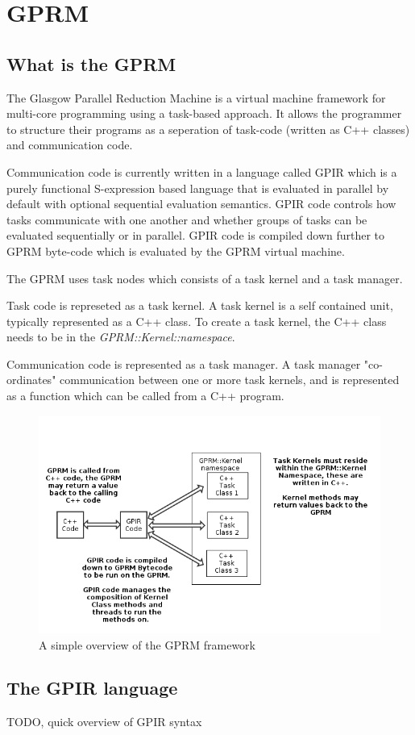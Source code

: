 \section{GPRM}

\subsection{What is the GPRM}

The Glasgow Parallel Reduction Machine is a virtual machine framework for multi-core programming using a task-based approach. It allows the programmer to structure their programs as a seperation of task-code (written as C++ classes) and communication code. 

Communication code is currently written in a language called GPIR which is a purely functional S-expression based language that is evaluated in parallel by default with optional sequential evaluation semantics. GPIR code controls how tasks communicate with one another and whether groups
of tasks can be evaluated sequentially or in parallel.  GPIR code is compiled down further to GPRM byte-code which is evaluated by the GPRM virtual machine.

The GPRM uses task nodes which consists of a task kernel and a task manager.

Task code is represeted as a task kernel. A task kernel is a self contained unit, typically represented as a C++ class.
To create a task kernel, the C++ class needs to be in the \textit{GPRM::Kernel::namespace}.

Communication code is represented as a task manager. A task manager "co-ordinates" communication between one or more task kernels, and
is represented as a function which can be called from a C++ program.\cite{GPRM}

\newpage

\begin{figure}[ht]
\begin{center}
\includegraphics{graphs/gprm.png}
\caption{A simple overview of the GPRM framework}
\end{center}
\end{figure}

\subsection{The GPIR language}
TODO, quick overview of GPIR syntax
